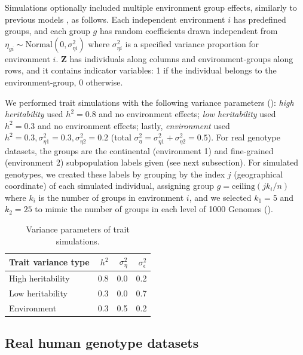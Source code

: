 \documentclass[9pt,lineno]{elife}
\begin{document}
Simulations optionally included multiple environment group effects, similarly to previous models \citep{zhang_principal_2015, wang_trade-offs_2022}, as follows.
Each independent environment $i$ has predefined groups, and each group $g$ has random coefficients drawn independent from $\eta_{gi} \sim \text{Normal}( 0, \sigma^2_{\eta i} )$ where $\sigma^2_{\eta i}$ is a specified variance proportion for environment $i$.
$\mathbf{Z}$ has individuals along columns and environment-groups along rows, and it contains indicator variables: 1 if the individual belongs to the environment-group, 0 otherwise.

We performed trait simulations with the following variance parameters ():
\textit{high heritability} used $h^2 = 0.8$ and no environment effects;
\textit{low heritability} used $h^2 = 0.3$ and no environment effects;
lastly,
\textit{environment} used $h^2 = 0.3, \sigma^2_{\eta 1} = 0.3, \sigma^2_{\eta 2} = 0.2$ (total $\sigma^2_\eta = \sigma^2_{\eta 1} + \sigma^2_{\eta 2} = 0.5$).
For real genotype datasets, the groups are the continental (environment 1) and fine-grained (environment 2) subpopulation labels given (see next subsection).
For simulated genotypes, we created these labels by grouping by the index $j$ (geographical coordinate) of each simulated individual, assigning group $g = \text{ceiling}( j k_i / n )$ where $k_i$ is the number of groups in environment $i$, and we selected $k_1 = 5$ and $k_2 = 25$ to mimic the number of groups in each level of 1000 Genomes ().

\begin{table}[bt]
  \caption{Variance parameters of trait simulations.}
  \label{tab:trait-var-sim}
  \begin{tabular}{lrrr}
    \toprule
    Trait variance type & $h^2$ & $\sigma^2_\eta$ & $\sigma^2_\epsilon$ \\
    \midrule
    High heritability & 0.8 & 0.0 & 0.2 \\
    Low heritability  & 0.3 & 0.0 & 0.7 \\
    Environment       & 0.3 & 0.5 & 0.2 \\
    \bottomrule
  \end{tabular}
\end{table}

\subsection{Real human genotype datasets}
\end{document}
